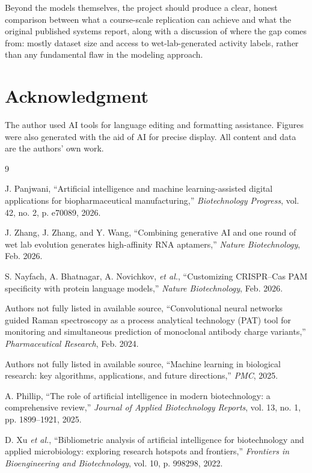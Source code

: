 \documentclass[11pt,a4paper]{article}
\begin{document}
Beyond the models themselves, the project should produce a clear, honest comparison between what a course-scale replication can achieve and what the original published systems report, along with a discussion of where the gap comes from: mostly dataset size and access to wet-lab-generated activity labels, rather than any fundamental flaw in the modeling approach.

\section*{Acknowledgment}

\noindent The author used AI tools for language editing and
formatting assistance. Figures were also generated with the aid of AI for precise display. All content and data
are the authors' own work.

\vspace{4pt} %

% 


\begin{thebibliography}{9}

J. Panjwani, ``Artificial intelligence and machine learning-assisted digital applications for biopharmaceutical manufacturing,'' \emph{Biotechnology Progress}, vol. 42, no. 2, p. e70089, 2026.

J. Zhang, J. Zhang, and Y. Wang, ``Combining generative AI and one round of wet lab evolution generates high-affinity RNA aptamers,'' \emph{Nature Biotechnology}, Feb. 2026.

S. Nayfach, A. Bhatnagar, A. Novichkov, \emph{et al.}, ``Customizing CRISPR--Cas PAM specificity with protein language models,'' \emph{Nature Biotechnology}, Feb. 2026.

Authors not fully listed in available source, ``Convolutional neural networks guided Raman spectroscopy as a process analytical technology (PAT) tool for monitoring and simultaneous prediction of monoclonal antibody charge variants,'' \emph{Pharmaceutical Research}, Feb. 2024.

Authors not fully listed in available source, ``Machine learning in biological research: key algorithms, applications, and future directions,'' \emph{PMC}, 2025.

A. Phillip, ``The role of artificial intelligence in modern biotechnology: a comprehensive review,'' \emph{Journal of Applied Biotechnology Reports}, vol. 13, no. 1, pp. 1899--1921, 2025.

D. Xu \emph{et al.}, ``Bibliometric analysis of artificial intelligence for biotechnology and applied microbiology: exploring research hotspots and frontiers,'' \emph{Frontiers in Bioengineering and Biotechnology}, vol. 10, p. 998298, 2022.

\end{thebibliography}
\end{document}
